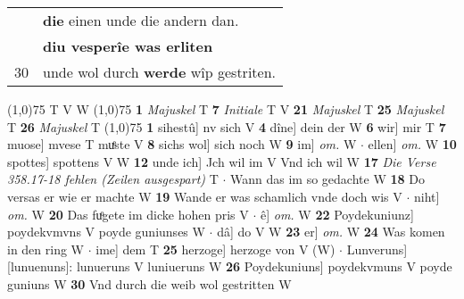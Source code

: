 \documentclass[8pt,a4paper,notitlepage]{article}
\begin{document}
\begin{table}[ht]
\begin{minipage}[t]{0.5\linewidth}
\begin{tabular}{rl}
 & \textbf{die} einen unde die andern dan.\\ 
 & \textbf{diu vesperîe was erliten}\\ 
30 & unde wol durch \textbf{werde} wîp gestriten.\\ 
\end{tabular}
\scriptsize
\line(1,0){75} \newline
T V W \newline
\line(1,0){75} \newline
\textbf{1} \textit{Majuskel} T  \textbf{7} \textit{Initiale} T V  \textbf{21} \textit{Majuskel} T  \textbf{25} \textit{Majuskel} T  \textbf{26} \textit{Majuskel} T  \newline
\line(1,0){75} \newline
\textbf{1} sihestû] nv sich V \textbf{4} dîne] dein der W \textbf{6} wir] mir T \textbf{7} muose] mvese T muͤste V \textbf{8} sichs wol] sich noch W \textbf{9} im] \textit{om.} W  $\cdot$ ellen] \textit{om.} W \textbf{10} spottes] spottens V W \textbf{12} unde ich] Jch wil im V Vnd ich wil W \textbf{17} \textit{Die Verse 358.17-18 fehlen (Zeilen ausgespart)} T   $\cdot$ Wann das im so gedachte W \textbf{18} Do versas er wie er machte W \textbf{19} Wande er was schamlich vnde doch wis V  $\cdot$ niht] \textit{om.} W \textbf{20} Das fuͦgete im dicke hohen pris V  $\cdot$ ê] \textit{om.} W \textbf{22} Poydekuniunz] poydekvmvns V poyde guniunses W  $\cdot$ dâ] do V W \textbf{23} er] \textit{om.} W \textbf{24} Was komen in den ring W  $\cdot$ ime] dem T \textbf{25} herzoge] herzoge von V (W)  $\cdot$ Lunveruns] [lunuenuns]: lunueruns V luniueruns W \textbf{26} Poydekuniuns] poydekvmuns V poyde guniuns W \textbf{30} Vnd durch die weib wol gestritten W \newline
\end{minipage}
\end{table}
\end{document}

